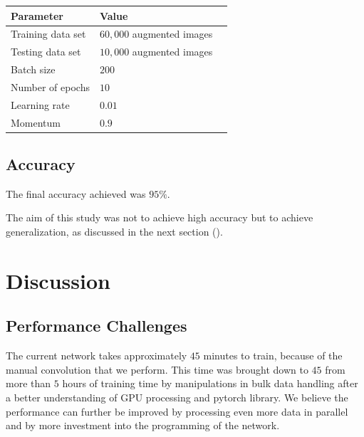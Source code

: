 \documentclass[12pt]{acmart}
\begin{document}
\begin{table}[H]
    \begin{tabular}{|l|l|l|}
    \hline
    Parameter           & Value\\ \hline
    Training data set   & $60,000$ augmented images \\ \hline
    Testing data set    & $10,000$ augmented images \\ \hline
    Batch size          & $200$                     \\ \hline
    Number of epochs    & $10$                      \\ \hline
    Learning rate       & $0.01$                    \\ \hline
    Momentum            & $0.9$                     \\ \hline
    \end{tabular}
\end{table}


\subsection{Accuracy}
The final accuracy achieved was $95\%$.

The aim of this study was not to achieve high accuracy but to achieve generalization, as discussed in the next section ().

\section{Discussion}
\subsection{Performance Challenges}
The current network takes approximately $45$ minutes to train, because of the manual convolution that we perform. This time was brought down to $45$ from more than $5$ hours of training time by manipulations in bulk data handling after a better understanding of GPU processing and pytorch library.
We believe the performance can further be improved by processing even more data in parallel and by more investment into the programming of the network.
\end{document}
